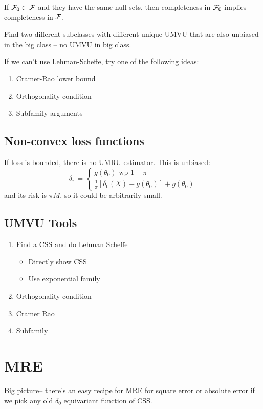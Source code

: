 \documentclass{article}
\begin{document}
\begin{fact}
If $\mathcal F_0 \subset \mathcal F$ and they have the same null sets, then completeness in $\mathcal F_0$ implies completeness in $\mathcal F$. 
\end{fact}
\begin{recipe}
Find two different subclasses with different unique UMVU that are also unbiased in the big class -- no UMVU in big class.	
\end{recipe}
If we can't use Lehman-Scheffe, try one of the following ideas:
\begin{enumerate}
	\item Cramer-Rao lower bound
	\item Orthogonality condition
	\item Subfamily arguments
\end{enumerate}
\subsection{Non-convex loss functions}
If loss is bounded, there is no UMRU estimator. This is unbiased:
$$\delta_\pi = \begin{cases}
	g(\theta_0) \text{ wp } 1-\pi\\
	\frac 1 \pi [\delta_0 (X) - g(\theta_0)] + g(\theta_0)
\end{cases}$$
and its risk is $\pi M$, so it could be arbitrarily small.

\subsection{UMVU Tools}
\begin{enumerate}
	\item Find a CSS and do Lehman Scheffe
	\begin{itemize}
		\item Directly show CSS
		\item Use exponential family
	\end{itemize}
	\item Orthogonality condition
	\item Cramer Rao
	\item Subfamily
\end{enumerate}


\section{MRE}
Big picture-- there's an easy recipe for MRE for square error or absolute error if we pick any old $\delta_0$ equivariant function of CSS. 
\end{document}
